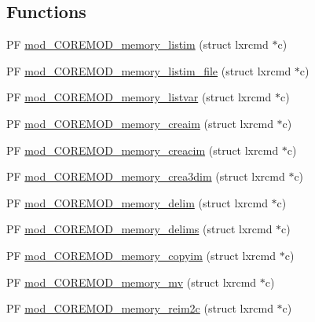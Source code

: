 \subsection*{Functions}
\begin{DoxyCompactItemize}
\item 
P\+F \hyperlink{src_2COREMOD__memory_2COREMOD__memory-util_8c_ac8d0f1f80414b71adbae2592d9ad4af5}{mod\+\_\+\+C\+O\+R\+E\+M\+O\+D\+\_\+memory\+\_\+listim} (struct lxrcmd $\ast$c)
\item 
P\+F \hyperlink{src_2COREMOD__memory_2COREMOD__memory-util_8c_a8a114cc202662e53948d49cbd1c24215}{mod\+\_\+\+C\+O\+R\+E\+M\+O\+D\+\_\+memory\+\_\+listim\+\_\+file} (struct lxrcmd $\ast$c)
\item 
P\+F \hyperlink{src_2COREMOD__memory_2COREMOD__memory-util_8c_a173fc6213f3d9b5e6564a1e3e33fbc8a}{mod\+\_\+\+C\+O\+R\+E\+M\+O\+D\+\_\+memory\+\_\+listvar} (struct lxrcmd $\ast$c)
\item 
P\+F \hyperlink{src_2COREMOD__memory_2COREMOD__memory-util_8c_a85535a68fa2604715174985843da67dd}{mod\+\_\+\+C\+O\+R\+E\+M\+O\+D\+\_\+memory\+\_\+creaim} (struct lxrcmd $\ast$c)
\item 
P\+F \hyperlink{src_2COREMOD__memory_2COREMOD__memory-util_8c_afb8072ed78b21728e71528e598c2e90d}{mod\+\_\+\+C\+O\+R\+E\+M\+O\+D\+\_\+memory\+\_\+creacim} (struct lxrcmd $\ast$c)
\item 
P\+F \hyperlink{src_2COREMOD__memory_2COREMOD__memory-util_8c_a09f3a118a1210d0e15800f50eaf81e2c}{mod\+\_\+\+C\+O\+R\+E\+M\+O\+D\+\_\+memory\+\_\+crea3dim} (struct lxrcmd $\ast$c)
\item 
P\+F \hyperlink{src_2COREMOD__memory_2COREMOD__memory-util_8c_a39875c37399e211d9c719151e13b5bb2}{mod\+\_\+\+C\+O\+R\+E\+M\+O\+D\+\_\+memory\+\_\+delim} (struct lxrcmd $\ast$c)
\item 
P\+F \hyperlink{src_2COREMOD__memory_2COREMOD__memory-util_8c_a830b002e9da6d2dc3074d608c90196d7}{mod\+\_\+\+C\+O\+R\+E\+M\+O\+D\+\_\+memory\+\_\+delims} (struct lxrcmd $\ast$c)
\item 
P\+F \hyperlink{src_2COREMOD__memory_2COREMOD__memory-util_8c_a5aaadd3c7687d102e2c4895034afd952}{mod\+\_\+\+C\+O\+R\+E\+M\+O\+D\+\_\+memory\+\_\+copyim} (struct lxrcmd $\ast$c)
\item 
P\+F \hyperlink{src_2COREMOD__memory_2COREMOD__memory-util_8c_a34a6828fbc7ebc1a853f73cb22d424ec}{mod\+\_\+\+C\+O\+R\+E\+M\+O\+D\+\_\+memory\+\_\+mv} (struct lxrcmd $\ast$c)
\item 
P\+F \hyperlink{src_2COREMOD__memory_2COREMOD__memory-util_8c_afce60e26804712fdb9dbe59f25fe1eff}{mod\+\_\+\+C\+O\+R\+E\+M\+O\+D\+\_\+memory\+\_\+reim2c} (struct lxrcmd $\ast$c)

\end{DoxyCompactItemize}
